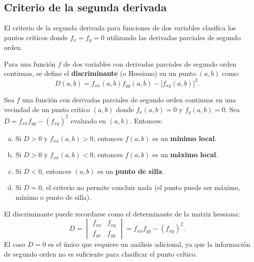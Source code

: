 \subsection{Criterio de la segunda derivada}

El criterio de la segunda derivada para funciones de dos variables
clasifica los puntos críticos donde $f_x=f_y=0$ utilizando las derivadas
parciales de segundo orden.

\begin{definition}
Para una función $f$ de dos variables con derivadas parciales de segundo
orden continuas, se define el \textbf{discriminante} (o Hessiano) en un
punto $(a,b)$ como:
\[
D(a,b) = f_{xx}(a,b) f_{yy}(a,b) - \bigl[f_{xy}(a,b)\bigr]^2.
\]
\end{definition}

\begin{theorem}
Sea $f$ una función con derivadas parciales de segundo orden continuas en
una vecindad de un punto crítico $(a,b)$ donde $f_x(a,b)=0$ y
$f_y(a,b)=0$. Sea $D = f_{xx}f_{yy} - (f_{xy})^2$ evaluado en $(a,b)$.
Entonces:
\begin{enumerate}[a)]
    \item Si $D > 0$ y $f_{xx}(a,b) > 0$, entonces $f(a,b)$ es un
    \textbf{mínimo local}.
    \item Si $D > 0$ y $f_{xx}(a,b) < 0$, entonces $f(a,b)$ es un
    \textbf{máximo local}.
    \item Si $D < 0$, entonces $(a,b)$ es un \textbf{punto de silla}.
    \item Si $D = 0$, el criterio no permite concluir nada (el punto
    puede ser máximo, mínimo o punto de silla).
\end{enumerate}
\end{theorem}

\begin{rem}
El discriminante puede recordarse como el determinante de la matriz
hessiana:
\[
D = \begin{vmatrix}
f_{xx} & f_{xy} \\
f_{yx} & f_{yy}
\end{vmatrix}
= f_{xx} f_{yy} - (f_{xy})^2.
\]
El caso $D=0$ es el único que requiere un análisis adicional, ya que la
información de segundo orden no es suficiente para clasificar el punto
crítico.
\end{rem}

